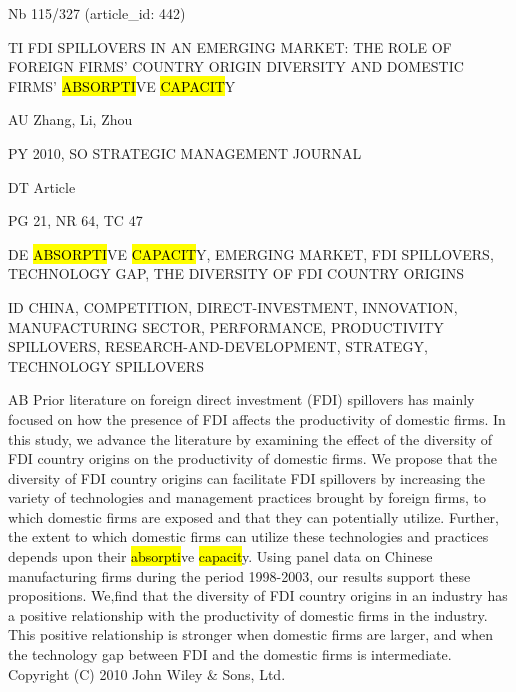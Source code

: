 \documentclass[a4paper]{article}
\begin{document}
\vspace*{-2cm}
Nb \tabto{0cm}115/327 (article\_id: 442)\par
TI \tabto{0cm}FDI SPILLOVERS IN AN EMERGING MARKET: THE ROLE OF FOREIGN FIRMS' COUNTRY ORIGIN DIVERSITY AND DOMESTIC FIRMS' \hl{ABSORPTI}VE \hl{CAPACIT}Y\par
AU \tabto{0cm}Zhang, Li, Zhou\par
PY \tabto{0cm}2010, SO STRATEGIC MANAGEMENT JOURNAL\par
DT \tabto{0cm}Article\par
PG \tabto{0cm}21, NR 64, TC 47\par
DE \tabto{0cm}\hl{ABSORPTI}VE \hl{CAPACIT}Y, EMERGING MARKET, FDI SPILLOVERS, TECHNOLOGY GAP, THE DIVERSITY OF FDI COUNTRY ORIGINS\par
ID \tabto{0cm}CHINA, COMPETITION, DIRECT-INVESTMENT, INNOVATION, MANUFACTURING SECTOR, PERFORMANCE, PRODUCTIVITY SPILLOVERS, RESEARCH-AND-DEVELOPMENT, STRATEGY, TECHNOLOGY SPILLOVERS\par
AB \tabto{0cm}Prior literature on foreign direct investment (FDI) spillovers has mainly focused on how the presence of FDI affects the productivity of domestic firms. In this study, we advance the literature by examining the effect of the diversity of FDI country origins on the productivity of domestic firms. We propose that the diversity of FDI country origins can facilitate FDI spillovers by increasing the variety of technologies and management practices brought by foreign firms, to which domestic firms are exposed and that they can potentially utilize. Further, the extent to which domestic firms can utilize these technologies and practices depends upon their \hl{absorpti}ve \hl{capacit}y. Using panel data on Chinese manufacturing firms during the period 1998-2003, our results support these propositions. We,find that the diversity of FDI country origins in an industry has a positive relationship with the productivity of domestic firms in the industry. This positive relationship is stronger when domestic firms are larger, and when the technology gap between FDI and the domestic firms is intermediate. Copyright (C) 2010 John Wiley \& Sons, Ltd.\par
\clearpage
\end{document}

